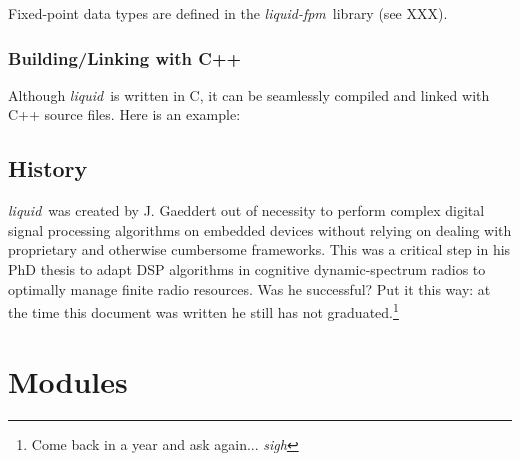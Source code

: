 \documentclass[11pt,twoside]{report}
\newcommand{\liquid}{{\it liquid}}
\newcommand{\liquidfpm}{{\it liquid-fpm}}
\begin{document}
Fixed-point data types are defined in the \liquidfpm\ library (see XXX).

\subsection{Building/Linking with C++}
Although \liquid\ is written in C, it can be seamlessly compiled and linked
with C++ source files.
Here is an example:


\section{History}
\liquid\ was created by J. Gaeddert out of necessity to perform complex
digital signal processing algorithms on embedded devices
without relying on dealing
with proprietary and otherwise cumbersome frameworks.
This was a critical step in his PhD thesis to adapt DSP algorithms in
cognitive dynamic-spectrum radios to optimally manage finite radio resources.
Was he successful?
Put it this way: at the time this document was written he still has not
graduated.\footnote{Come back in a year and ask again... {\em sigh}}

%
%
\chapter{Modules}
\label{ch:modules}


























%
%
\end{document}
